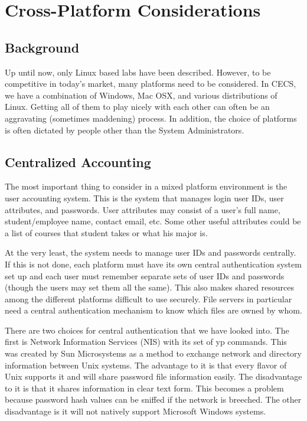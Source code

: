 \section{Cross-Platform Considerations} \label{sec:crossplatform}
\subsection{Background}
Up until now, only Linux based labs have been described.  However, to be competitive in today's market, many platforms need to be considered.  In CECS, we have a combination of Windows, Mac OSX, and various distributions of Linux.   Getting all of them to play nicely with each other can often be an aggravating (sometimes maddening) process.  In addition, the choice of platforms is often dictated by people other than the System Administrators. 
\subsection{Centralized Accounting}
The most important thing to consider in a mixed platform environment is the user accounting system.  This is the system that manages login user IDs, user attributes, and passwords.  User attributes may consist of a user's full name, student/employee name, contact email, etc.  Some other useful attributes could be a list of courses that student takes or what his major is.  

At the very least, the system needs to manage user IDs and passwords centrally.  If this is not done, each platform must have its own central authentication system set up and each user must remember separate sets of user IDs and passwords (though the users may set them all the same).  This also makes shared resources among the different platforms difficult to use securely.  File servers in particular need a central authentication mechanism to know which files are owned by whom.  

There are two choices for central authentication that we have looked into.  The first is Network Information Services (NIS) with its set of yp commands.  This was created by Sun Microsystems as a method to exchange network and directory information between Unix systems.  The advantage to it is that every flavor of Unix supports it and will share password file information easily.  The disadvantage to it is that it shares information in clear text form.  This becomes a problem because password hash values can be sniffed if the network is breeched.  The other disadvantage is it will not natively support Microsoft Windows systems.  

